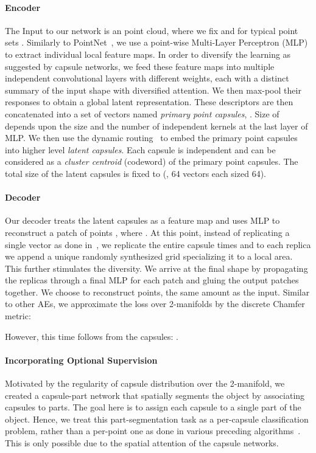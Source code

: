 \documentclass[10pt,twocolumn,letterpaper]{article}
\theoremstyle{break}
\begin{document}
\vspace{-3mm}\paragraph{Encoder} The Input to our network is an  point cloud, where we fix  and for typical point sets . Similarly to PointNet~\cite{qi2017pointnet}, we use a point-wise Multi-Layer Perceptron (MLP)  to extract individual local feature maps. In order to diversify the learning as suggested by capsule networks, we feed these feature maps into multiple independent convolutional layers with different weights, each with a distinct summary of the input shape with diversified attention. We then max-pool their responses to obtain a global latent representation. These descriptors are then concatenated into a set of vectors named \textit{primary point capsules}, . Size of  depends upon the size  and the number  of independent kernels at the last layer of MLP. We then use the dynamic routing~\cite{sabour2017dynamic} to embed the primary point capsules into higher level \textit{latent capsules}. Each capsule is independent and can be considered as a \textit{cluster centroid} (codeword) of the primary point capsules. The total size of the latent capsules is fixed to  (\ie, 64 vectors each sized 64).

\paragraph{Decoder}
Our decoder treats the latent capsules as a feature map and uses MLP to reconstruct a patch of points , where .
At this point, instead of replicating a single vector as done in~\cite{Yang_2018_CVPR, groueix2018}, we replicate the entire capsule  times and to each replica we append a unique randomly synthesized grid  specializing it to a local area. This further stimulates the diversity. We arrive at the final shape  by propagating the replicas through a final MLP for each patch and gluing the output patches together. We choose  to reconstruct  points, the same amount as the input. 
Similar to other AEs, we approximate the loss over 2-manifolds by the discrete Chamfer metric:

However, this time  follows from the capsules: . 
\paragraph{Incorporating Optional Supervision}
Motivated by the regularity of capsule distribution over the 2-manifold, we created a capsule-part network that spatially segments the object by associating capsules to parts. The goal here is to assign each capsule to a single part of the object. Hence, we treat this part-segmentation task as a per-capsule classification problem, rather than a per-point one as done in various preceding algorithms~\cite{qi2017pointnet,Qi2017PointNetDH}. This is only possible due to the spatial attention of the capsule networks.
\end{document}
